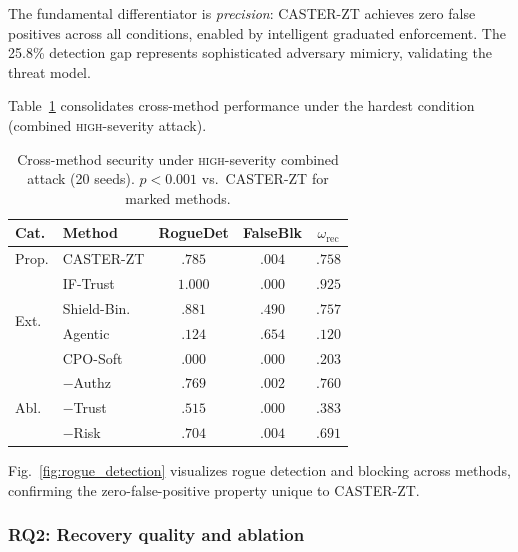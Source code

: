 \documentclass[lettersize,journal]{IEEEtran}
\begin{document}
The fundamental differentiator is \emph{precision}: CASTER-ZT achieves zero false positives across all conditions, enabled by intelligent graduated enforcement.
The 25.8\% detection gap represents sophisticated adversary mimicry, validating the threat model.

Table~\ref{tab:cross_method} consolidates cross-method performance under the hardest condition (combined \textsc{high}-severity attack).

\begin{table}[t]
\centering
\caption{Cross-method security under \textsc{high}-severity combined attack (20 seeds). $p<0.001$ vs.\ CASTER-ZT for marked methods.}
\label{tab:cross_method}
\scriptsize
\setlength{\tabcolsep}{2pt}
\begin{tabular}{@{}llccc@{}}
\toprule
Cat. & Method & RogueDet & FalseBlk & $\omega_{\mathrm{rec}}$ \\
\midrule
Prop. & CASTER-ZT & $\mathbf{.785}$ & $\mathbf{.004}$ & $\mathbf{.758}$ \\
\midrule
\multirow{4}{*}{Ext.}
  & IF-Trust & $1.000$ & $.000$ & $.925$ \\
  & Shield-Bin. & $.881$ & $.490$ & $.757$ \\
  & Agentic & $.124$ & $.654$ & $.120$ \\
  & CPO-Soft & $.000$ & $.000$ & $.203$ \\
\midrule
\multirow{3}{*}{Abl.}
  & $-$Authz & $.769$ & $.002$ & $.760$ \\
  & $-$Trust & $.515$ & $.000$ & $.383$ \\
  & $-$Risk & $.704$ & $.004$ & $.691$ \\
\bottomrule
\end{tabular}
\end{table}

Fig.~\ref{fig:rogue_detection} visualizes rogue detection and blocking across methods, confirming the zero-false-positive property unique to CASTER-ZT.

\subsubsection{RQ2: Recovery quality and ablation}
\end{document}
